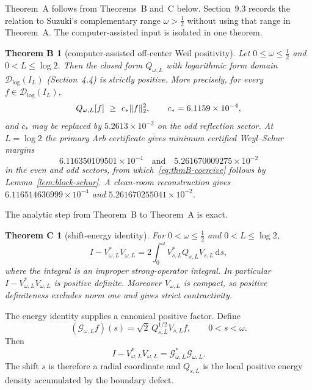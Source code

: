 \documentclass[11pt,a4paper]{article}
\newcommand{\Dlog}{\mathcal D_{\log}}
\newcommand{\dd}{\,\mathrm d}
\newcommand{\Gcal}{\mathcal G}
\DeclarePairedDelimiter{\norm}{\lVert}{\rVert}
\theoremstyle{plain}
\newtheorem*{thmB}{Theorem B}
\newtheorem*{thmC}{Theorem C}
\theoremstyle{definition}
\numberwithin{equation}{section}
\begin{document}
Theorem~A follows from Theorems~B and~C below. Section~9.3 records the
relation to Suzuki's complementary range $\omega>\tfrac12$ without using that
range in Theorem~A. The computer-assisted input is isolated in one theorem.

\begin{thmB}[computer-assisted off-center Weil positivity]
Let $0\le\omega\le\tfrac12$ and $0<L\le\log2$. Then the closed form
$Q_{\omega,L}$ with logarithmic form domain $\Dlog(I_L)$ (Section~4.4) is
strictly positive. More precisely, for every $f\in\Dlog(I_L)$,
\begin{equation}\label{eq:thmB-coercive}
Q_{\omega,L}[f]\ \ge\ c_*\norm f_2^2,
\qquad c_*=6.1159\times10^{-4},
\end{equation}
and $c_*$ may be replaced by $5.2613\times10^{-2}$ on the odd reflection
sector. At $L=\log2$ the primary Arb certificate gives minimum certified
Weyl--Schur margins
\[
6.116350109501\times10^{-4}
\quad\text{and}\quad
5.261670009275\times10^{-2}
\]
in the even and odd sectors, from which~\eqref{eq:thmB-coercive} follows by
Lemma~\ref{lem:block-schur}. A clean-room reconstruction gives
$6.116514636999\times10^{-4}$ and $5.261670255041\times10^{-2}$.
\end{thmB}

The analytic step from Theorem~B to Theorem~A is exact.

\begin{thmC}[shift-energy identity]
For $0<\omega\le\tfrac12$ and $0<L\le\log2$,
\begin{equation}\label{eq:energy-identity}
I-V_{\omega,L}^{*}V_{\omega,L}
=2\int_0^\omega V_{s,L}^{*}Q_{s,L}V_{s,L}\dd s,
\end{equation}
where the integral is an improper strong-operator integral. In particular
$I-V_{\omega,L}^{*}V_{\omega,L}$ is positive definite. Moreover $V_{\omega,L}$
is compact, so positive definiteness excludes norm one and gives strict
contractivity.
\end{thmC}

The energy identity supplies a canonical positive factor. Define
\begin{equation}
(\Gcal_{\omega,L}f)(s)=\sqrt2\,Q_{s,L}^{1/2}V_{s,L}f,\qquad 0<s<\omega .
\end{equation}
Then
\begin{equation}
I-V_{\omega,L}^{*}V_{\omega,L}=\Gcal_{\omega,L}^{*}\Gcal_{\omega,L}.
\end{equation}
The shift $s$ is therefore a radial coordinate and $Q_{s,L}$ is the local
positive energy density accumulated by the boundary defect.
\end{document}
